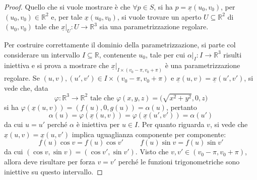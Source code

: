 \documentclass[12pt]{scrartcl}
\theoremstyle{style}
\numberwithin{equation}{subsection}
\begin{document}
\begin{proof}
	Quello che si vuole mostrare \`e che $\forall p \in S$, si ha $p = \underline{x}(u_0,v_0)$, per $(u_0,v_0) \in \mathbb{R}^2$ e, per tale $\underline{x}(u_0,v_0)$, si vuole trovare un aperto $U \subseteq \mathbb{R}^2$ di $(u_0,v_0)$ tale che $\underline{x}|_U : U \to \mathbb{R}^3$ sia una parametrizzazione regolare.

	Per costruire correttamente il dominio della parametrizzazione, si parte col considerare un intervallo $I \subseteq \mathbb{R}$, contenente $u_0$, tale per cui $\alpha |_I:I\to\mathbb{R}^3$ risulti iniettiva e si prova a mostrare che $\underline{x}|_{I \times (v_0-\pi,v_0+\pi)} $ \`e una parametrizzazione regolare.
	Se $(u,v), (u',v') \in I \times (v_0-\pi,v_0+\pi)$ e $\underline{x}(u,v) = \underline{x}(u',v')$, si vede che, data
	\[
	\varphi : \mathbb{R}^3 \to \mathbb{R}^2 \text{ tale che } \varphi (x,y,z) = \big(\sqrt{x^2 + y^2 } ,0,z\big)
	\] 
	si ha $\varphi (\underline{x}(u,v)) = (f(u),0,g(u)) = \alpha (u)$, pertanto 
	\[
	\alpha (u) = \varphi (\underline{x}(u,v)) = \varphi (\underline{x}(u',v')) = \alpha (u')
	\] 
	da cui $u = u'$ perch\'e $\alpha $ \`e iniettiva per $u \in I$.
	Per quanto riguarda $v$, si vede che $\underline{x}(u,v) = \underline{x}(u,v')$ implica uguaglianza componente per componente:
	\[
	f(u) \cos v =  f (u ) \cos v' \hspace{1cm}f(u) \sin v = f(u) \sin v ' 
	\] 
	da cui $(\cos v , \sin v ) = (\cos v',\sin v')$. 
	Visto che $v , v' \in (v_0 - \pi, v_0 + \pi)$, allora deve risultare per forza $v = v'$ perch\'e le funzioni trigonometriche sono iniettive su questo intervallo.


\end{proof}
\end{document}
